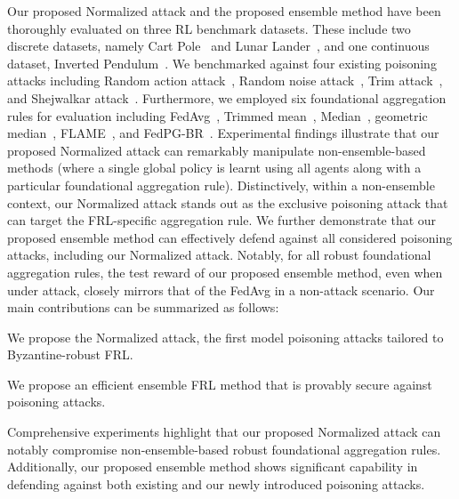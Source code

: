 Our proposed Normalized attack and the proposed ensemble method have been thoroughly evaluated on three RL benchmark datasets. These include two discrete datasets, namely Cart Pole~\cite{barto1983neuronlike} and Lunar Lander~\cite{duan2016benchmarking}, and one continuous dataset, Inverted Pendulum~\cite{barto1983neuronlike}. 
We benchmarked against four existing poisoning attacks including Random action attack~\cite{fan2021fault}, Random noise attack~\cite{fan2021fault}, Trim attack~\cite{fang2020local}, and Shejwalkar attack~\cite{shejwalkar2021manipulating}. 
Furthermore, we employed six foundational aggregation rules for evaluation including FedAvg~\cite{mcmahan2017communication}, Trimmed mean~\cite{yin2018byzantine}, Median~\cite{yin2018byzantine}, geometric median~\cite{ChenPOMACS17}, FLAME~\cite{nguyen2022flame}, and FedPG-BR~\cite{fan2021fault}.
%
%
Experimental findings illustrate that our proposed Normalized attack can remarkably manipulate non-ensemble-based methods (where a single global policy is learnt using all agents along with a particular foundational aggregation rule). Distinctively, within a non-ensemble context, our Normalized attack stands out as the exclusive poisoning attack that can target the FRL-specific aggregation rule.
%
We further demonstrate that our proposed ensemble method can effectively defend against all considered poisoning attacks, including our Normalized attack. Notably, for all robust foundational aggregation rules, the test reward of our proposed ensemble method, even when under attack, closely mirrors that of the FedAvg in a non-attack scenario.
%
Our main contributions can be summarized as follows:

\begin{list}{}{\leftmargin=1em \itemindent=-0.08em \itemsep=.2em}
	
    \item 
    We propose the Normalized attack, the first model poisoning attacks tailored to Byzantine-robust FRL.
    
    \item
    We propose an efficient ensemble FRL method that is provably secure against poisoning attacks.
    
    \item 
    Comprehensive experiments highlight that our proposed Normalized attack can notably compromise non-ensemble-based robust foundational aggregation rules. Additionally, our proposed ensemble method shows significant capability in defending against both existing and our newly introduced poisoning attacks.
    
\end{list}	




